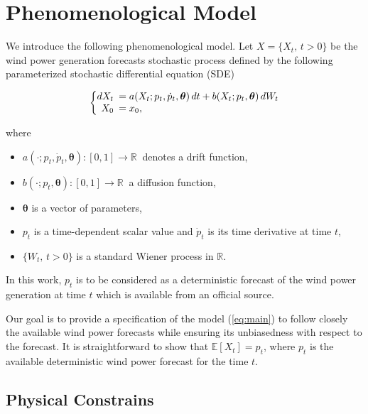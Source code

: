 \documentclass[11pt]{article}
\theoremstyle{definition}
\begin{document}
\section{Phenomenological  Model} \label{Section_2}

We introduce the following phenomenological model. Let $X = \{X_t, \, t>0\}$  be the  wind power generation forecasts stochastic process defined by the following parameterized stochastic differential equation (SDE)

\begin{equation}
  \left\{
  \begin{array}{@{}rl@{}}
    dX_t \!\!\!&=  a(X_t; p_t, \dot{p}_t,\bm{\theta}) \,dt + b (X_t; p_t, \bm{\theta} ) \,dW_t  \\
     X_0  \!\!\!&=  x_0,
  \end{array}\right. \label{eq:main}
\end{equation} 

where

\begin{itemize}
\item $a(\cdot; p_t, \dot{p}_t,\bm{\theta}):[0,1] \to \mathbb{R} \ $  denotes a drift function,
\item $b (\cdot;p_t, \bm{\theta} ):[0,1] \to \mathbb{R} \ $  a  diffusion function,
\item $\bm{\theta}$ is a vector of parameters,
\item $p_t$ is a time-dependent scalar value and $ \dot{p}_t$ is its time derivative at time $t$,
\item $\{W_t, \, t >0\}$ is a standard Wiener process in $\mathbb{R}$.
\end{itemize}

In this work, $p_t$ is to be considered as a deterministic forecast of the wind power generation at time $t$ which is available from an official source. 

Our goal is to provide a specification of the model (\ref{eq:main}) to follow closely the available wind power forecasts while ensuring its unbiasedness with respect to the forecast. It is straightforward to show that $\mathbb{E} \left[X_t\right] = p_t$, where $p_t$ is the available deterministic wind power forecast for the time $t$.

\subsection{Physical Constrains}
\end{document}
